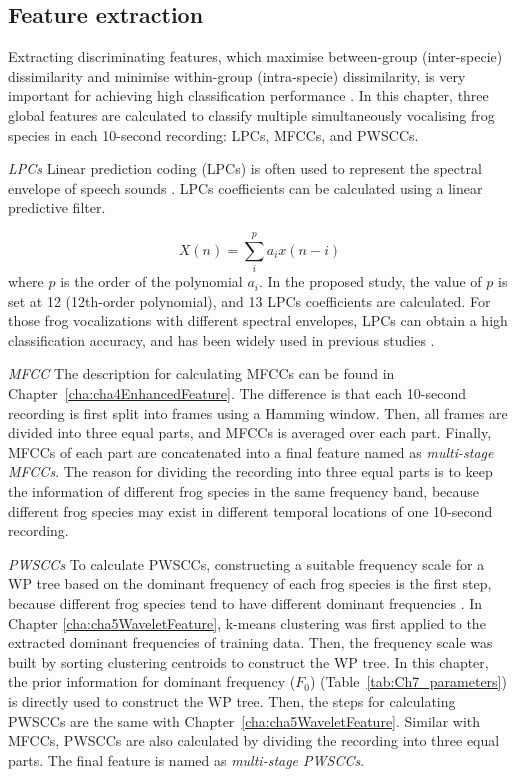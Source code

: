 \subsection{Feature extraction}
Extracting discriminating features, which maximise between-group (inter-specie) dissimilarity
and minimise within-group (intra-specie) dissimilarity, is very important for achieving high classification performance \citep{huang2009frog, bedoya2014automatic}. In this chapter, three global features are calculated to classify multiple simultaneously vocalising frog species in each 10-second recording: LPCs, MFCCs, and PWSCCs. 





\textit{LPCs}
Linear prediction coding (LPCs) is often used to represent the spectral envelope of speech sounds \citep{itakura1975line}. LPCs coefficients can be calculated using a linear predictive filter.

\begin{equation}
X(n) = \sum_{i}^{p}a_{i}x(n-i)
\end{equation}
where $p$ is the order of the polynomial $a_{i}$. In the proposed study, the value of $p$ is set at 12 (12th-order polynomial), and 13 LPCs coefficients are calculated. For those frog vocalizations with different spectral envelopes, LPCs can obtain a high classification accuracy, and has been widely used in previous studies \cite{yuan2012frog, jaafarcomparative, jaafar2015effect}.

\textit{MFCC}
The description for calculating MFCCs can be found in Chapter~\ref{cha:cha4EnhancedFeature}. The difference is that each 10-second recording is first split into frames using a Hamming window. Then, all frames are divided into three equal parts, and MFCCs is averaged over each part. Finally, MFCCs of each part are concatenated into a final feature named as \textit{multi-stage MFCCs}. The reason for dividing the recording into three equal parts is to keep the information of different frog species in the same frequency band, 
because different frog species may exist in different temporal locations of one 10-second recording. 


\textit{PWSCCs}
To calculate PWSCCs, constructing a suitable frequency scale for a WP tree based on the dominant frequency of each frog species is the first step, because different frog species tend to have different dominant frequencies \citep{Gingras2013}. In Chapter \ref{cha:cha5WaveletFeature}, k-means clustering was first applied to the extracted dominant frequencies of training data. Then, the frequency scale was built by sorting clustering centroids to construct the WP tree. In this chapter, the prior information for dominant frequency ($F_{0}$) (Table~\ref{tab:Ch7_parameters}) is directly used to construct the WP tree. Then, the steps for calculating PWSCCs are the same with Chapter~\ref{cha:cha5WaveletFeature}. Similar with MFCCs, PWSCCs are also calculated by dividing the recording into three equal parts. The final feature is named as \textit{multi-stage PWSCCs}.

